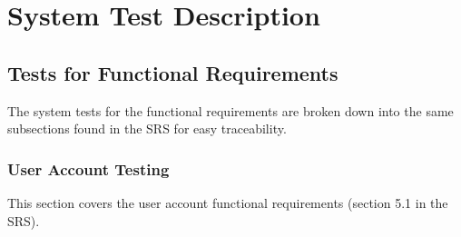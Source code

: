 \documentclass[12pt, titlepage]{article}
\begin{document}
\section{System Test Description}
	
\subsection{Tests for Functional Requirements}

The system tests for the functional requirements are broken down into the same subsections found in the SRS for easy traceability.

\subsubsection{User Account Testing}
This section covers the user account functional requirements (section 5.1 in the SRS).
\end{document}
